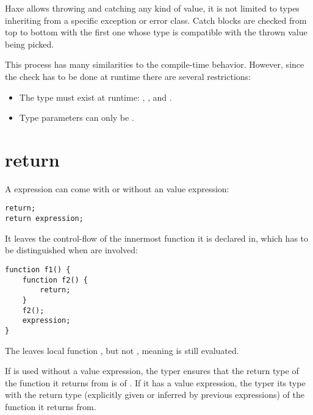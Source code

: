 Haxe allows throwing and catching any kind of value, it is not limited to types inheriting from a specific exception or error class. Catch blocks are checked from top to bottom with the first one whose type is compatible with the thrown value being picked.

This process has many similarities to the compile-time  behavior. However, since the check has to be done at runtime there are several restrictions:

\begin{itemize}
	\item The type must exist at runtime: , ,  and .
	\item Type parameters can only be .
\end{itemize}



\section{return}
\label{expression-return}

A  expression can come with or without an value expression:

\begin{lstlisting}
return;
return expression;
\end{lstlisting}

It leaves the control-flow of the innermost function it is declared in, which has to be distinguished when  are involved:

\begin{lstlisting}
function f1() {
	function f2() {
		return;
	}
	f2();
	expression;
}
\end{lstlisting}

The  leaves local function , but not , meaning  is still evaluated.

If  is used without a value expression, the typer ensures that the return type of the function it returns from is of . If it has a value expression, the typer  its type with the return type (explicitly given or inferred by previous  expressions) of the function it returns from.


